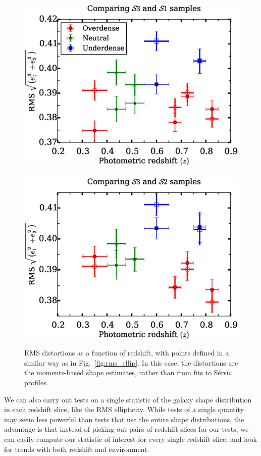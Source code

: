 \documentclass[twocolumn,useAMS,usenatbib]{mn2e}
\newcommand{\sersic}{S\'{e}rsic }
\begin{document}
\begin{figure}
 \includegraphics[width=1.0\columnwidth]{rms_ellip_momentbased_noevolution.eps} \
 \includegraphics[width=1.0\columnwidth]{rms_ellip_momentbased_Bbandevolution.eps} \\
 \caption{RMS distortions as a function of redshift, with points
   defined in a similar way as in Fig.~\ref{fig:rms_ellip}.  In this
   case, the distortions are the moments-based shape estimates, rather
   than from fits to \sersic profiles. }
 \label{fig:rms_ellip_momentbased}         
\end{figure}

We can also carry out tests on a single statistic of the galaxy shape
distribution in each redshift slice, like the RMS ellipticity.  While
tests of a single quantity may seem less powerful than tests that use
the entire shape distributions, the advantage is that instead of
picking out pairs of redshift slices for our tests, we can easily compute our
statistic of interest for every single redshift slice, and look for
trends with both redshift and environment.
\end{document}
